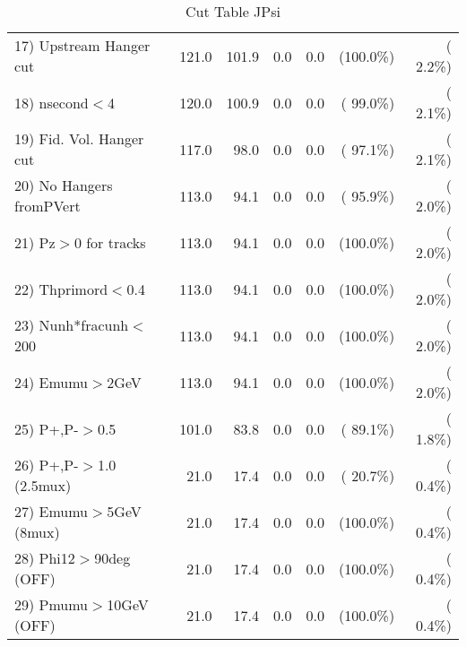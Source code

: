 \begin{table}[h!]
\begin{tabular}{||l||r|r|r|r|r|r||}
 17) Upstream Hanger cut  &        121.0 &        101.9 &          0.0 &          0.0 & (100.0\%) & (  2.2\%) \\
 18) nsecond$<$4          &        120.0 &        100.9 &          0.0 &          0.0 & ( 99.0\%) & (  2.1\%) \\
 19) Fid. Vol. Hanger cut &        117.0 &         98.0 &          0.0 &          0.0 & ( 97.1\%) & (  2.1\%) \\
 20) No Hangers fromPVert &        113.0 &         94.1 &          0.0 &          0.0 & ( 95.9\%) & (  2.0\%) \\
 21) Pz$>$0 for tracks    &        113.0 &         94.1 &          0.0 &          0.0 & (100.0\%) & (  2.0\%) \\
 22) Thprimord$<$0.4      &        113.0 &         94.1 &          0.0 &          0.0 & (100.0\%) & (  2.0\%) \\
 23) Nunh*fracunh$<$200   &        113.0 &         94.1 &          0.0 &          0.0 & (100.0\%) & (  2.0\%) \\
 24) Emumu$>$2GeV         &        113.0 &         94.1 &          0.0 &          0.0 & (100.0\%) & (  2.0\%) \\
 25) P+,P-$>$0.5          &        101.0 &         83.8 &          0.0 &          0.0 & ( 89.1\%) & (  1.8\%) \\
 26) P+,P-$>$1.0 (2.5mux) &         21.0 &         17.4 &          0.0 &          0.0 & ( 20.7\%) & (  0.4\%) \\
 27) Emumu$>$5GeV  (8mux) &         21.0 &         17.4 &          0.0 &          0.0 & (100.0\%) & (  0.4\%) \\
 28) Phi12$>$90deg  (OFF) &         21.0 &         17.4 &          0.0 &          0.0 & (100.0\%) & (  0.4\%) \\
 29) Pmumu$>$10GeV  (OFF) &         21.0 &         17.4 &          0.0 &          0.0 & (100.0\%) & (  0.4\%) \\
 \hline
 \hline
 \end{tabular}
 \caption{Cut Table  JPsi     }
 \label{tab-cutcohjpsi-mumu_jpsi}
 \end{table}
